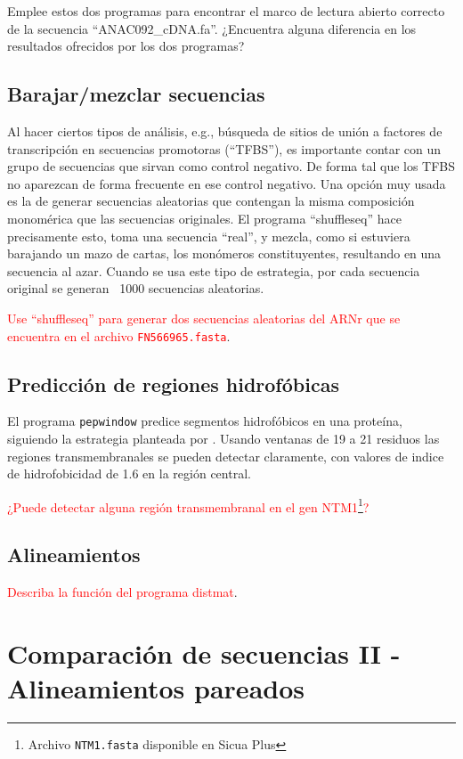 \documentclass[letter,11pt]{book}
\begin{document}
{
\color{red}Emplee estos dos programas para encontrar el marco de lectura abierto correcto de la secuencia ``ANAC092\_cDNA.fa''. ¿Encuentra alguna diferencia en los resultados ofrecidos por los dos programas?
}

\section{Barajar/mezclar secuencias}

Al hacer ciertos tipos de análisis, e.g., búsqueda de sitios de unión a factores de transcripción en secuencias promotoras (``TFBS''), es importante contar con un grupo de secuencias que sirvan como control negativo. De forma tal que los TFBS no aparezcan de forma frecuente en ese control negativo. Una opción muy usada es la de generar secuencias aleatorias que contengan la misma composición monomérica que las secuencias originales. El programa ``shuffleseq'' hace precisamente esto, toma una secuencia ``real'', y mezcla, como si estuviera barajando un mazo de cartas, los monómeros constituyentes, resultando en una secuencia al azar. Cuando se usa este tipo de estrategia, por cada secuencia original se generan ~1000 secuencias aleatorias.

\textcolor{red}{Use ``shuffleseq'' para generar dos secuencias aleatorias del ARNr que se encuentra en el archivo \Verb+FN566965.fasta+}.

\section{Predicción de  regiones hidrofóbicas}
El programa \Verb+pepwindow+ predice segmentos hidrofóbicos en una proteína, siguiendo la estrategia planteada por \citep{Kyte1982}. Usando ventanas de 19 a 21 residuos las regiones transmembranales se pueden detectar claramente, con valores de indice de hidrofobicidad de 1.6 en la región central.

\textcolor{red}{¿Puede detectar alguna región transmembranal en el gen NTM1\footnote{Archivo \Verb+NTM1.fasta+ disponible en Sicua Plus}?}

\section{Alineamientos}

\textcolor{red}{Describa la función del programa distmat}.

\chapter{Comparación de secuencias II - Alineamientos pareados}
\end{document}
